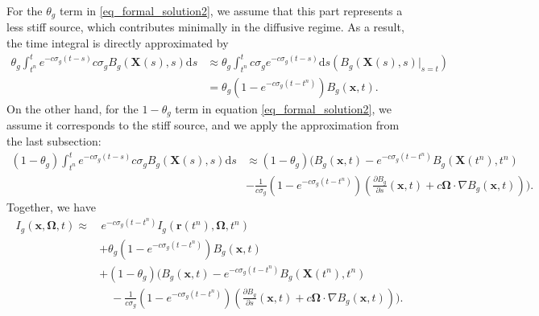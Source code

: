 \documentclass[preprint,12pt]{elsarticle}
\theoremstyle{definition}
\theoremstyle{plain}
\numberwithin{equation}{section}
\numberwithin{algorithm}{section}
\newcounter{eq_count}
\newcommand{\vOmega}{\mathbf{\Omega}}
\newcommand{\vx}{\mathbf{x}}
\newcommand{\mfx}{{\mathbf{X}}}
\newcommand{\dd}{{\text{d}}}
\newcommand{\pdrv}[2]{\frac{\partial{#1}}{\partial{#2}}}
\begin{document}
    For the $ \theta_g $ term in \eqref{eq_formal_solution2}, we assume that this part represents a less stiff source, which contributes minimally in the diffusive regime. As a result, the time integral is directly approximated by
 \begin{equation}
		\begin{aligned}\label{eq_approximation2}
      \theta_g \int_{t^n}^{t} e^{- c  \sigma_g (t - s )} c\sigma_{g} B_g ( \mfx(s),  s )\dd{s} 
        & \approx  \theta_g \int_{t^n}^t c \sigma_{g} e^{-c \sigma_{g}(t-s)}    \dd{s} \left(  B_g  ( \mfx(s),  s )  \Big|_{s = t} \right)
        \\ 
		& = \theta_g ( 1 - e^{-c \sigma_{g}(t-t^n)}) B_g    \left( \vx,  t\right).
		\end{aligned}
	\end{equation}
On the other hand, for the $ 1 - \theta_g $ term in equation \eqref{eq_formal_solution2}, we assume it corresponds to the stiff source, and we apply the approximation from the last subsection:
   \begin{equation}
        \begin{aligned}
           (1-\theta_g)\int_{t^n}^t e^{- c  \sigma_g (t - s )} c\sigma_{g} B_g ( \mfx(s),  s ) \dd{s}&\approx  (1-\theta_g)  \Bigg (  B_g(\vx,t) - e^{- c  \sigma_g (t - t^n )}  
            B_g( \mfx(t^n),t^n )
            \\
            & - \frac{1}{c\sigma_g} (1 -  e^{- c \sigma_g (t - t^{n} ) } ) \left( \pdrv{B_g}{s}(\vx,t) +  c \vOmega \cdot \nabla B_g(\vx,t)  \right) \Bigg).
        \end{aligned}
    \end{equation}
Together, we have 
    \begin{equation}\label{eq_formal_solution_approximated2}
		\begin{aligned}
		  I_g( \vx, \vOmega,t)
            \approx & \, e^{- c  \sigma_g (t - t^n)} I_{g}( \mathbf{r}(t^n), \vOmega,t^n) 
            \\ 
		  & +  \theta_g     ( 1 - e^{-c \sigma_{g}(t-t^n)}) B_g  \left( \vx,  t\right) 
            \\
            & + ( 1 - \theta_g  )  \Bigg( B_g \left( \vx,  t\right)-e^{- c  \sigma_g (t - t^n)} B_g \left( \mathbf{X}(t^n),  t^n\right)  \\ 
			& \quad  -  \frac{1}{c \sigma_g} (1 - e^{-c \sigma_{g}(t-t^n)}) \left( \pdrv{B_g}{s}(\vx,t) +  c \vOmega \cdot \nabla B_g(\vx,t)  \right)   \Bigg).
		\end{aligned}
    \end{equation}
\end{document}
